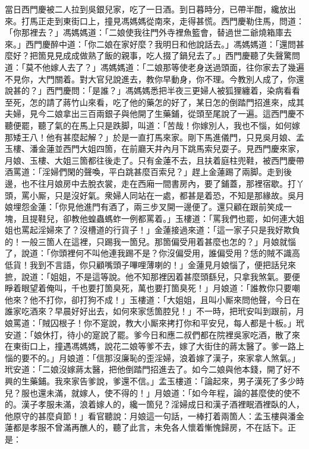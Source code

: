 當日西門慶被二人拉到吳銀兒家，吃了一日酒。到日暮時分，已帶半酣，纔放出來。打馬正走到東街口上，撞見馮媽媽從南來，走得甚慌。西門慶勒住馬，問道：「你那裡去？」馮媽媽道：「二娘使我往門外寺裡魚籃會，替過世二爺燒箱庫去來。」西門慶醉中道：「你二娘在家好麼？我明日和他說話去。」{}馮媽媽道：「還問甚麼好？把箇見見成成做熟了飯的親事，吃人掇了鍋兒去了。」西門慶聽了失聲驚問道：「莫不他嫁人去了？」馮媽媽道：「二娘那等使老身送過頭面，往你家去了幾遍不見你，大門關着。對大官兒說進去，教你早動身，你不理。今教別人成了，你還說甚的？」西門慶問：「是誰？」馮媽媽悉把半夜三更婦人被狐狸纏着，染病看看至死，怎的請了蔣竹山來看，吃了他的藥怎的好了，某日怎的倒踏門招進來，成其夫婦，見今二娘拿出三百兩銀子與他開了生藥鋪，從頭至尾說了一遍。這西門慶不聽便罷，聽了氣的在馬上只是跌脚，叫道：「苦哉！你嫁別人，我也不惱，如何嫁那矮王八！他有甚麼起解？」於是一直打馬來家。剛下馬進儀門，只見吳月娘、孟玉樓、潘金蓮並西門大姐四箇，在前廳天井內月下跳馬索兒耍子。見西門慶來家，月娘、玉樓、大姐三箇都往後走了。只有金蓮不去，且扶着庭柱兜鞋，{}被西門慶帶酒罵道：「淫婦們閑的聲喚，{}平白跳甚麼百索兒？」趕上金蓮踢了兩脚。走到後邊，也不往月娘房中去脫衣裳，走在西廂一間書房內，要了鋪蓋，那裡宿歇。打丫頭，罵小厮，只是沒好氣。衆婦人同站在一處，都甚是着恐，不知是那緣故。吳月娘埋怨金蓮：「你見他進門有酒了，兩三步叉開一邊便了。還只顧在跟前笑成一塊，且提鞋兒，卻教他蝗蟲螞蚱一例都罵着。」玉樓道：「罵我們也罷，如何連大姐姐也罵起淫婦來了？沒槽道的行貨子！」金蓮接過來道：「這一家子只是我好欺負的！一般三箇人在這裡，只踢我一箇兒。那箇偏受用着甚麼也怎的？」月娘就惱了，說道：「你頭裡何不叫他連我踢不是？你沒偏受用，誰偏受用？恁的賊不識高低貨！我到不言語，你只顧嘴頭子嗶哩薄喇的！」{}金蓮見月娘惱了，便把話兒來摭，說道：「姐姐，不是這等說。他不知那裡因着甚麼頭繇兒，只拿我煞氣。要便睜着眼望着俺叫，千也要打箇臭死，萬也要打箇臭死！」月娘道：「誰教你只要嘲他來？他不打你，卻打狗不成！」玉樓道：「大姐姐，且叫小厮來問他聲，今日在誰家吃酒來？早晨好好出去，如何來家恁箇腔兒！」不一時，把玳安叫到跟前，月娘罵道：「賊囚根子！你不寔說，教大小厮來拷打你和平安兒，每人都是十板。」玳安道：「娘休打，待小的寔說了罷。爹今日和應二叔們都在院裡吳家吃酒，散了來在東街口上，撞遇馮媽媽，說花二娘等爹不去，嫁了大街住的蔣太醫了。爹一路上惱的要不的。」月娘道：「信那沒廉恥的歪淫婦，浪着嫁了漢子，來家拿人煞氣。」玳安道：「二娘沒嫁蔣太醫，把他倒踏門招進去了。如今二娘與他本錢，開了好不興的生藥鋪。我來家告爹說，爹還不信。」孟玉樓道：「論起來，男子漢死了多少時兒？服也還未滿，就嫁人，使不得的！」月娘道：「如今年程，論的甚麼使的使不的。漢子孝服未滿，浪着嫁人的，纔一箇兒？淫婦成日和漢子酒裡眠酒裡臥的人，他原守的甚麼貞節！」看官聽說：月娘這一句話，一棒打着兩箇人：孟玉樓與潘金蓮都是孝服不曾滿再醮人的，聽了此言，未免各人懷着慚愧歸房，不在話下。正是：

